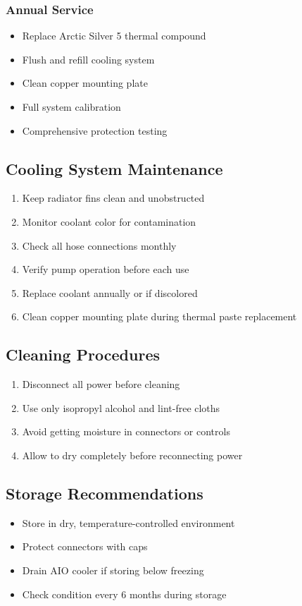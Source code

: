 \documentclass[11pt,a4paper]{article}
\begin{document}
\subsubsection{Annual Service}
\begin{itemize}
    \item Replace Arctic Silver 5 thermal compound
    \item Flush and refill cooling system
    \item Clean copper mounting plate
    \item Full system calibration
    \item Comprehensive protection testing
\end{itemize}

\subsection{Cooling System Maintenance}
\begin{enumerate}
    \item Keep radiator fins clean and unobstructed
    \item Monitor coolant color for contamination
    \item Check all hose connections monthly
    \item Verify pump operation before each use
    \item Replace coolant annually or if discolored
    \item Clean copper mounting plate during thermal paste replacement
\end{enumerate}

\subsection{Cleaning Procedures}
\begin{enumerate}
    \item Disconnect all power before cleaning
    \item Use only isopropyl alcohol and lint-free cloths
    \item Avoid getting moisture in connectors or controls
    \item Allow to dry completely before reconnecting power
\end{enumerate}

\subsection{Storage Recommendations}
\begin{itemize}
    \item Store in dry, temperature-controlled environment
    \item Protect connectors with caps
    \item Drain AIO cooler if storing below freezing
    \item Check condition every 6 months during storage
\end{itemize}
\end{document}
